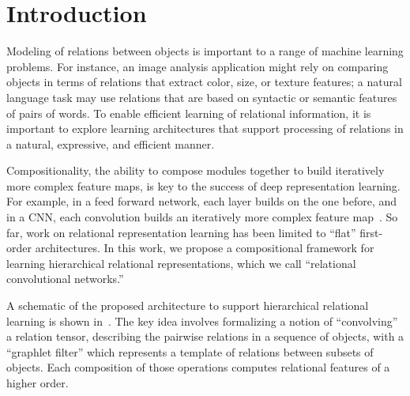 \section{Introduction}\label{sec:intro}

Modeling of relations between objects is important to a range of machine learning problems. For instance, an image analysis application might rely on comparing objects in terms of relations that extract color, size, or texture features; a natural language task may use relations that are based on syntactic or semantic features of pairs of words. To enable efficient learning of relational information, it is important to explore learning architectures that support processing of relations in a natural, expressive, and efficient manner. %

Compositionality, the ability to compose modules together to build iteratively more complex feature maps, is key to the success of deep representation learning. For example, in a feed forward network, each layer builds on the one before, and in a CNN, each convolution builds an iteratively more complex feature map~\citep{zeiler2014visualizing}. So far, work on relational representation learning has been limited to ``flat'' first-order architectures. In this work, we propose a compositional framework for learning hierarchical relational representations, which we call ``relational convolutional networks.''

A schematic of the proposed architecture to support hierarchical relational learning is shown in~. The key idea involves formalizing a notion of ``convolving'' a relation tensor, describing the pairwise relations in a sequence of objects, with a ``graphlet filter'' which represents a template of relations between subsets of objects. Each composition of those operations computes relational features of a higher order.


